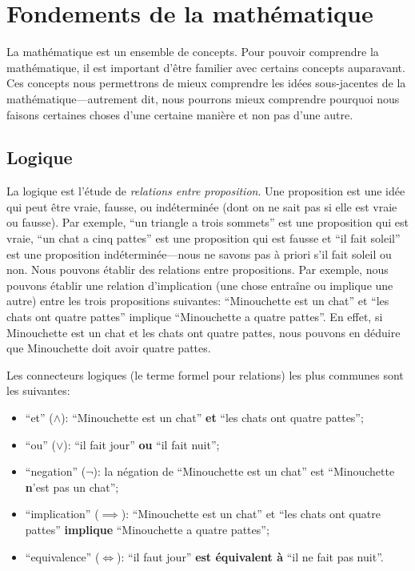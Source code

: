 \chapter{Fondements de la mathématique}

La mathématique est un ensemble de concepts. Pour pouvoir comprendre la mathématique, il est important d'être familier avec certains concepts auparavant. Ces concepts nous permettrons de mieux comprendre les idées sous-jacentes de la mathématique---autrement dit, nous pourrons mieux comprendre pourquoi nous faisons certaines choses d'une certaine manière et non pas d'une autre.

\section{Logique}

La logique est l'étude de {\em relations entre proposition}. Une proposition est une idée qui peut être vraie, fausse, ou indéterminée (dont on ne sait pas si elle est vraie ou fausse). Par exemple, ``un triangle a trois sommets'' est une proposition qui est vraie, ``un chat a cinq pattes'' est une proposition qui est fausse et ``il fait soleil'' est une proposition indéterminée---nous ne savons pas à priori s'il fait soleil ou non. Nous pouvons établir des relations entre propositions. Par exemple, nous pouvons établir une relation d'implication (une chose entraîne ou implique une autre) entre les trois propositions suivantes: ``Minouchette est un chat'' et ``les chats ont quatre pattes'' implique ``Minouchette a quatre pattes''. En effet, si Minouchette est un chat et les chats ont quatre pattes, nous pouvons en déduire que Minouchette doit avoir quatre pattes.

Les connecteurs logiques (le terme formel pour relations) les plus communes sont les suivantes:
\begin{itemize}
    \item ``et'' ($\wedge$): ``Minouchette est un chat'' \textbf{et} ``les chats ont quatre pattes'';
    \item ``ou'' ($\vee$): ``il fait jour'' \textbf{ou} ``il fait nuit'';
    \item ``negation'' ($\neg$): la négation de ``Minouchette est un chat'' est ``Minouchette \textbf{n}'est pas un chat'';
    \item ``implication'' ($\implies$): ``Minouchette est un chat'' et ``les chats ont quatre pattes'' \textbf{implique} ``Minouchette a quatre pattes'';
    \item ``equivalence'' ($\iff$): ``il faut jour'' \textbf{est équivalent à} ``il ne fait pas nuit''.
\end{itemize}



